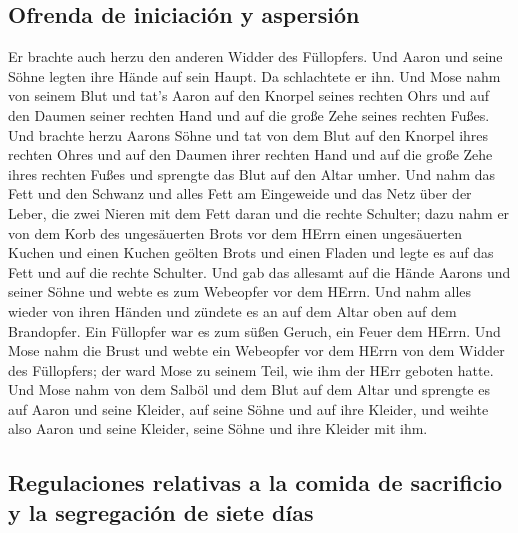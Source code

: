 \hypertarget{ofrenda-de-iniciaciuxf3n-y-aspersiuxf3n}{%
\subsection{Ofrenda de iniciación y
aspersión}\label{ofrenda-de-iniciaciuxf3n-y-aspersiuxf3n}}

 Er brachte auch herzu den anderen Widder des Füllopfers.
Und Aaron und seine Söhne legten ihre Hände auf sein Haupt.
 Da schlachtete er ihn. Und Mose nahm von seinem Blut und
tat's Aaron auf den Knorpel seines rechten Ohrs und auf den Daumen
seiner rechten Hand und auf die große Zehe seines rechten Fußes.
 Und brachte herzu Aarons Söhne und tat von dem Blut auf
den Knorpel ihres rechten Ohres und auf den Daumen ihrer rechten Hand
und auf die große Zehe ihres rechten Fußes und sprengte das Blut auf den
Altar umher.  Und nahm das Fett und den Schwanz und alles
Fett am Eingeweide und das Netz über der Leber, die zwei Nieren mit dem
Fett daran und die rechte Schulter;  dazu nahm er von dem
Korb des ungesäuerten Brots vor dem HErrn einen ungesäuerten Kuchen und
einen Kuchen geölten Brots und einen Fladen und legte es auf das Fett
und auf die rechte Schulter.  Und gab das allesamt auf
die Hände Aarons und seiner Söhne und webte es zum Webeopfer vor dem
HErrn.  Und nahm alles wieder von ihren Händen und
zündete es an auf dem Altar oben auf dem Brandopfer. Ein Füllopfer war
es zum süßen Geruch, ein Feuer dem HErrn.  Und Mose nahm
die Brust und webte ein Webeopfer vor dem HErrn von dem Widder des
Füllopfers; der ward Mose zu seinem Teil, wie ihm der HErr geboten
hatte.  Und Mose nahm von dem Salböl und dem Blut auf dem
Altar und sprengte es auf Aaron und seine Kleider, auf seine Söhne und
auf ihre Kleider, und weihte also Aaron und seine Kleider, seine Söhne
und ihre Kleider mit ihm.

\hypertarget{regulaciones-relativas-a-la-comida-de-sacrificio-y-la-segregaciuxf3n-de-siete-duxedas}{%
\subsection{Regulaciones relativas a la comida de sacrificio y la
segregación de siete
días}\label{regulaciones-relativas-a-la-comida-de-sacrificio-y-la-segregaciuxf3n-de-siete-duxedas}}

